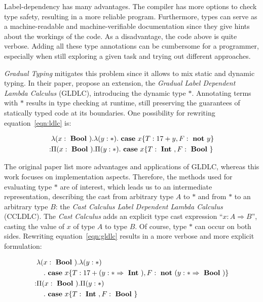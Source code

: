 Label-dependency has many advantages. The compiler has more options to check type safety, resulting in a more reliable program. Furthermore, types can serve as a machine-readable and machine-verifiable documentation since they give hints about the workings of the code.
As a disadvantage, the code above is quite verbose. Adding all these type annotations can be cumbersome for a programmer, especially when still exploring a given task and trying out different approaches.

\emph{Gradual Typing} mitigates this problem since it allows to mix static and dynamic typing. In their paper, \cite{fu2021} propose an extension, the \emph{Gradual Label Dependent Lambda Calculus} (GLDLC), introducing the dynamic type $\ast$. Annotating terms with $\ast$ results in type checking at runtime, still preserving the guarantees of statically typed code at its boundaries. One possibility for rewriting equation~\ref{eqn:ldlc} is:

\begin{equation}\label{eqn:gldlc}
\begin{split}
&\lambda (x: \text{ \textbf{Bool} })
. \lambda (y: \ast)
. \text{ \textbf{case} } x \{T: 17+y,F: \text{ \textbf{not} } y\} \\
: & \Pi(x : \text{ \textbf{Bool} })
. \Pi (y: \ast)
. \text{ \textbf{case} } x \{T: \text{ \textbf{Int} }, F: \text{ \textbf{Bool} } \}
\end{split}
\end{equation}

The original paper list more advantages and applications of GLDLC, whereas this work focuses on implementation aspects. Therefore, the methods used for evaluating type $\ast$ are of interest, which leads us to an intermediate representation, describing the cast from arbitrary type $A$ to $\ast$ and from $\ast$ to an arbitrary type $B$: the \emph{Cast Calculus Label Dependent Lambda Calculus} (CCLDLC). The \emph{Cast Calculus} adds an explicit type cast expression ``$x : A \Rightarrow B$'', casting the value of $x$ of type $A$ to type $B$. Of course, type $\ast$ can occur on both sides. Rewriting equation~\ref{eqn:gldlc} results in a more verbose and more explicit formulation:

\begin{equation}\label{eqn:ccldlc}
\begin{split}
&\lambda (x: \text{ \textbf{Bool} }) . \lambda (y: \ast ) \\
&\quad . \text{ \textbf{case} } x \{T: 17+(y:\ast \Rightarrow \text{ \textbf{Int} }),F: \text{ \textbf{not} } (y:\ast \Rightarrow \text{ \textbf{Bool} })\} \\
: & \Pi(x : \text{ \textbf{Bool} }) . \Pi (y: \ast ) \\
&\quad . \text{ \textbf{case} } x \{T: \text{ \textbf{Int} }, F: \text{ \textbf{Bool} } \}
\end{split}
\end{equation}

